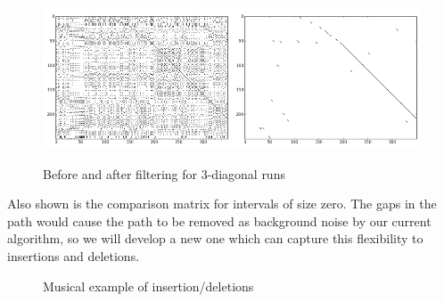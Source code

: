 \documentclass{article}
\begin{document}
\begin{figure}[h]
\begin{center}\includegraphics[width=0.5\textwidth]{easybefore.png}\includegraphics[width=0.5\textwidth]{easyafter.png}
\end{center}\caption{Before and after filtering for 3-diagonal runs} \label{fig:diag-filtering}
\end{figure}

Also shown is the comparison matrix for intervals of size zero. The gaps in the path would cause the path to be removed as background noise by our current algorithm, so we will develop a new one which can capture this flexibility to insertions and deletions. 

\begin{figure}[h]
  \centering
  \hspace*{.2in}
  \caption{Musical example of insertion/deletions} \label{fig:indel-example}
\end{figure}
\end{document}
